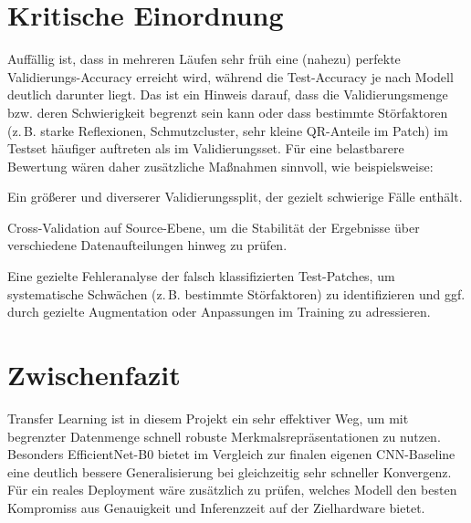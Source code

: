 \section{Kritische Einordnung}
\label{sec:transfer_kritik}

Auffällig ist, dass in mehreren Läufen sehr früh eine (nahezu) perfekte Validierungs-Accuracy erreicht wird, während die Test-Accuracy je nach Modell deutlich darunter liegt. Das ist ein Hinweis darauf, dass die Validierungsmenge bzw. deren Schwierigkeit begrenzt sein kann oder dass bestimmte Störfaktoren (z.\,B. starke Reflexionen, Schmutzcluster, sehr kleine \ac{QR}-Anteile im Patch) im Testset häufiger auftreten als im Validierungsset. Für eine belastbarere Bewertung wären daher zusätzliche Maßnahmen sinnvoll, wie beispielsweise:
\begin{listAlph}
    \item Ein größerer und diverserer Validierungssplit, der gezielt schwierige Fälle enthält.
    \item Cross-Validation auf Source-Ebene, um die Stabilität der Ergebnisse über verschiedene Datenaufteilungen hinweg zu prüfen.
    \item Eine gezielte Fehleranalyse der falsch klassifizierten Test-Patches, um systematische Schwächen (z.\,B. bestimmte Störfaktoren) zu identifizieren und ggf. durch gezielte Augmentation oder Anpassungen im Training zu adressieren.
\end{listAlph}

\section{Zwischenfazit}
\label{sec:transfer_fazit}

Transfer Learning ist in diesem Projekt ein sehr effektiver Weg, um mit begrenzter Datenmenge schnell robuste Merkmalsrepräsentationen zu nutzen. Besonders EfficientNet-B0 bietet im Vergleich zur finalen eigenen \ac{CNN}-Baseline eine deutlich bessere Generalisierung bei gleichzeitig sehr schneller Konvergenz. Für ein reales Deployment wäre zusätzlich zu prüfen, welches Modell den besten Kompromiss aus Genauigkeit und Inferenzzeit auf der Zielhardware bietet.
